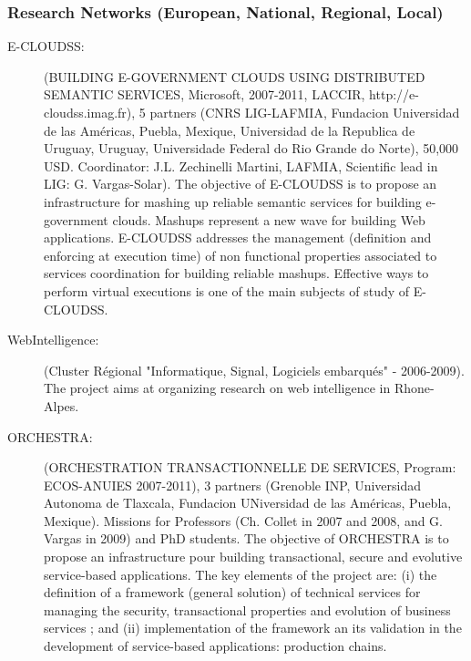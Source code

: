 \subsubsection{Research Networks (European, National, Regional, Local)}

\begin{description}

\item[E-CLOUDSS:] (BUILDING E-GOVERNMENT CLOUDS USING DISTRIBUTED SEMANTIC SERVICES, Microsoft, 2007-2011, LACCIR, http://e-cloudss.imag.fr), 5 partners (CNRS LIG-LAFMIA, Fundacion Universidad de las Am{\'e}ricas, Puebla, Mexique, Universidad de la Republica de Uruguay, Uruguay, Universidade Federal do Rio Grande do Norte), 50,000 USD. Coordinator: J.L. Zechinelli Martini, LAFMIA, Scientific lead in LIG: G. Vargas-Solar). 
The objective of E-CLOUDSS is to propose an infrastructure for mashing up reliable semantic services for building e-government clouds. Mashups represent a new wave for building Web applications. E-CLOUDSS addresses the management (definition and enforcing at execution time) of non functional properties associated to services coordination for building reliable mashups. Effective ways to perform virtual executions is one of the main subjects of study of E-CLOUDSS.

\item[WebIntelligence:] (Cluster R{\'e}gional "Informatique, Signal, Logiciels embarqu{\'e}s" - 2006-2009). The project aims at organizing research on web intelligence in Rhone-Alpes. 

\item[ORCHESTRA:] (ORCHESTRATION TRANSACTIONNELLE DE SERVICES, Program: ECOS-ANUIES 2007-2011), 3 partners (Grenoble INP, Universidad Autonoma de Tlaxcala, Fundacion UNiversidad de las Am{\'e}ricas, Puebla, Mexique). Missions for Professors (Ch. Collet in 2007 and  2008, and G. Vargas in 2009) and PhD students. The objective of ORCHESTRA is to propose an infrastructure pour building transactional, secure and evolutive service-based applications. The key elements of the project are: (i) the definition of a framework (general solution) of technical services for managing the security, transactional properties and evolution of business services ; and (ii) implementation of the framework an its validation in the development of service-based applications: production chains. 

\end{description}

